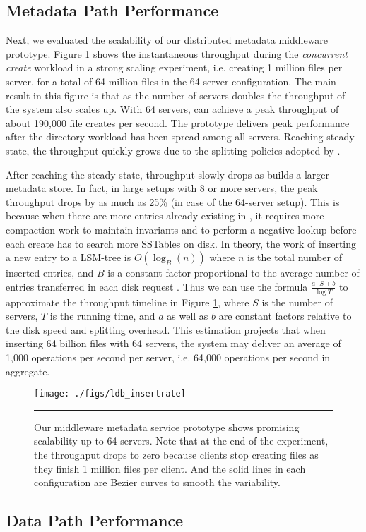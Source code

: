 \subsection{Metadata Path Performance}

Next, we evaluated the scalability of our distributed metadata middleware
prototype.
Figure \ref{graph:ldb-scaling} shows the instantaneous throughput during the
\textit{concurrent create} workload in a strong scaling experiment, i.e.
creating 1 million files per server, for a total of 64 million files in the
64-server configuration.
The main result in this figure is that as the number of servers doubles the
throughput of the system also scales up. With 64 servers, \giga{} can achieve a
peak throughput of about 190,000 file creates per second. The prototype delivers
peak performance after the directory workload has been spread among all
servers.
Reaching steady-state, the throughput quickly grows due to the splitting
policies adopted by \giga{}.

After reaching the steady state, throughput slowly drops as \ldb builds a
larger metadata store.
In fact, in large setups with 8 or more servers,
the peak throughput drops by as much as 25\% (in case of the 64-server setup).
This is because when there are more entries already existing in \ldb,
it requires more compaction work to maintain \ldb invariants and to perform a
negative lookup before each create has to search more SSTables on disk.
In theory, the work of inserting a new entry to a LSM-tree is $O(\log_{B}(n))$
where $n$ is the total number of inserted entries, and $B$ is a constant factor
proportional to the average number of entries transferred in each disk request
\cite{Bender2007}.
Thus we can use the formula $\frac{a\cdot S+b}{\log{T}}$ to
approximate the throughput timeline in Figure \ref{graph:ldb-scaling},
where $S$ is the number of servers, $T$ is the running time, and $a$ as well as $b$
are constant factors relative to the disk speed and splitting overhead.
This estimation projects that when inserting 64 billion files with 64 servers,
the system may deliver an average of 1,000 operations per second per server,
i.e. 64,000 operations per second in aggregate.

\begin{figure}[t]  %
\centerline{\texttt{[image: ./figs/ldb\_insertrate]}}
\caption{\normalsize
Our middleware metadata service prototype shows promising scalability
up to 64 servers.
Note that at the end of the experiment,
the throughput drops to zero
because clients stop creating files as they finish 1 million files per client.
And the solid lines in each configuration are Bezier
curves to smooth the variability.
}
\vspace{10pt}
\hrule
\label{graph:ldb-scaling}
\end{figure}       %

\subsection{Data Path Performance}

